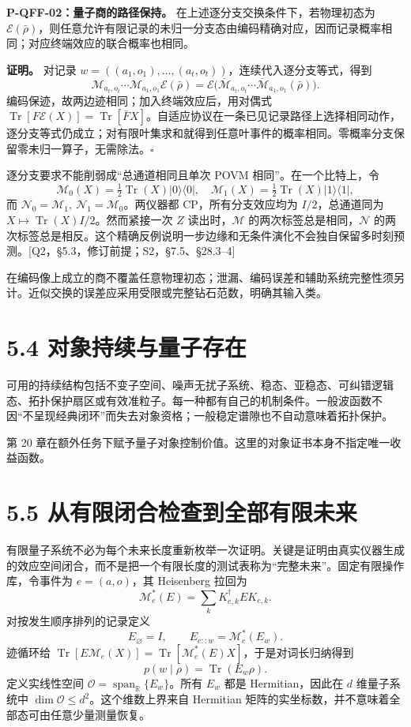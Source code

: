 \documentclass[
  11pt,
  oneside]{book}
\begin{document}
\textbf{P-QFF-02：量子商的路径保持。}
在上述逐分支交换条件下，若物理初态为
\(\mathcal E(\bar\rho)\)，则任意允许有限记录的未归一分支态由编码精确对应，因而记录概率相同；对应终端效应的联合概率也相同。

\textbf{证明。} 对记录
\(w=((a_1,o_1),\ldots,(a_t,o_t))\)，连续代入逐分支等式，得到 \[
\mathcal M_{a_t,o_t}\cdots\mathcal M_{a_1,o_1}\mathcal E(\bar\rho)
=\mathcal E\bigl(\overline{\mathcal M}_{a_t,o_t}\cdots
\overline{\mathcal M}_{a_1,o_1}(\bar\rho)\bigr).
\] 编码保迹，故两边迹相同；加入终端效应后，用对偶式
\(\operatorname{Tr}[F\mathcal E(X)]=\operatorname{Tr}[\bar F X]\)。自适应协议在一条已见记录路径上选择相同动作，逐分支等式仍成立；对有限叶集求和就得到任意叶事件的概率相同。零概率分支保留零未归一算子，无需除法。\(\square\)

逐分支要求不能削弱成``总通道相同且单次 POVM 相同''。在一个比特上，令 \[
\mathcal M_0(X)=\tfrac12\operatorname{Tr}(X)|0\rangle\langle0|,
\quad\mathcal M_1(X)=\tfrac12\operatorname{Tr}(X)|1\rangle\langle1|,
\] 而
\(\mathcal N_0=\mathcal M_1,\ \mathcal N_1=\mathcal M_0\)。两仪器都
CP，所有分支效应均为 \(I/2\)，总通道同为
\(X\mapsto\operatorname{Tr}(X)I/2\)。然而紧接一次 \(Z\)
读出时，\(\mathcal M\) 的两次标签总是相同，\(\mathcal N\)
的两次标签总是相反。这个精确反例说明一步边缘和无条件演化不会独自保留多时刻预测。{[}Q2，§5.3，修订前提；S2，§7.5、§28.3--4{]}

在编码像上成立的商不覆盖任意物理初态；泄漏、编码误差和辅助系统完整性须另计。近似交换的误差应采用受限或完整钻石范数，明确其输入类。

\section{5.4 对象持续与量子存在}

可用的持续结构包括不变子空间、噪声无扰子系统、稳态、亚稳态、可纠错逻辑态、拓扑保护扇区或有效准粒子。每一种都有自己的机制条件。一般波函数不因``不呈现经典闭环''而失去对象资格；一般稳定谱隙也不自动意味着拓扑保护。

第 20
章在额外任务下赋予量子对象控制价值。这里的对象证书本身不指定唯一收益函数。

\section{5.5 从有限闭合检查到全部有限未来}

有限量子系统不必为每个未来长度重新枚举一次证明。关键是证明由真实仪器生成的效应空间闭合，而不是把一个有限长度的测试表称为``完整未来''。固定有限操作库，令事件为
\(e=(a,o)\)，其 Heisenberg 拉回为 \[
\mathcal M_e^*(E)=\sum_kK_{e,k}^\dagger E K_{e,k}.
\] 对按发生顺序排列的记录定义 \[
E_{\varnothing}=I,\qquad E_{e::w}=\mathcal M_e^*(E_w).
\] 迹循环给
\(\operatorname{Tr}[E\mathcal M_e(X)]=\operatorname{Tr}[\mathcal M_e^*(E)X]\)，于是对词长归纳得到
\[
p(w\mid\rho)=\operatorname{Tr}(E_w\rho).
\] 定义实线性空间
\(\mathcal O=\operatorname{span}_{\mathbb R}\{E_w\}\)。所有 \(E_w\) 都是
Hermitian，因此在 \(d\) 维量子系统中
\(\dim\mathcal O\le d^2\)。这个维数上界来自 Hermitian
矩阵的实坐标数，并不意味着全部态可由任意少量测量恢复。
\end{document}
